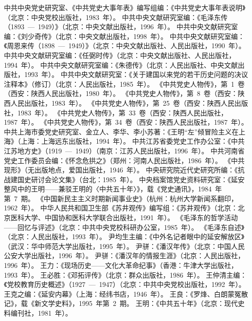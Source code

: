 \begin{thebibliography}{999}
\bibitem{}中共中央党史研究室、《中共党史大事年表》编写组编：《中共党史大事年表说明》（北京：中央党校出版社，1983~年）。
\bibitem{}中共中央文献研究室编：《毛泽东传（1893~—~1949）》（北京：中央文献出版社，1996~年）。
\bibitem{}中共中央文献研究室编：《刘少奇传》（北京：中央文献出版社，1998~年）。
\bibitem{}中共中央文献研究室编：《周恩来传（1898~—~1949）》（北京：中央文献出版社、人民出版社，1990~年）。
\bibitem{}中共中央文献研究室编：《任弼时传》（北京：中央文献出版社、人民出版社，1994~年）。
\bibitem{}中共中央文献研究室编：《朱德传》（北京：人民出版社、中央文献出版社，1993~年）。
\bibitem{}中共中央文献研究室：《关于建国以来党的若干历史问题的决议注释本》（修订）（北京：人民出版社，1985~年）。
\bibitem{}《中共党史人物传》，第~1~卷（西安：陕西人民出版社，1980~年）。
\bibitem{}《中共党史人物传》，第~8~卷（西安：陕西人民出版社，1983~年）。
\bibitem{}《中共党史人物传》，第~25~卷（西安：陕西人民出版社，1983~年）。
\bibitem{}《中共党史人物传》，第~33~卷（西安：陕西人民出版社，1987~年）。
\bibitem{}《中共党史人物传》，第~34~卷（西安：陕西人民出版社，1987~年）。
\bibitem{}中共上海市委党史研究室、金立人、李华、李小苏著：《王明“左”倾冒险主义在上海》（上海：上海远东出版社，1994~年）。
\bibitem{}中共江苏省委党史工作办公室：《中共江苏地方史》（1919~—~1949）（南京：江苏人民出版社，1996~年）。
\bibitem{}中共河南省党史工作委员会编：《怀念危拱之》（郑州：河南人民出版社，1986~年）。
\bibitem{}《中共现形》（无出版地点，爱国出版社，1946~年）。
\bibitem{}中央研究院近代史研究所编：《抗战建国史研讨会论文集》（台北：1985~年）。
\bibitem{}中央档案馆党史资料研究室：《延安整风中的王明——兼驳王明的〈中共五十年〉》，载《党史通讯》，1984~年第~7~期。
\bibitem{}《中国新民主主义时期新闻事业史》（杭州：杭州大学新闻系翻印，1962~年）。
\bibitem{}中华人民共和国卫生部《苏井观传》编写组：《苏井观传》（北京：北京医科大学、中国协和医科大学联合出版社，1991~年）。
\bibitem{}《毛泽东的哲学活动——回忆与评述》（北京：中共中央党校科研办公室，1985~年）。
\bibitem{}《毛泽东自述》（北京：人民出版社，1993~年）。
\bibitem{}尹均生主编：《中外名记者眼中的延安解放区》（武汉：华中师范大学出版社，1995~年）。
\bibitem{}尹骈：《潘汉年传》（北京：中国人民公安大学出版社，1996~年）。
\bibitem{}尹骈：《潘汉年的情报生涯》（北京：人民出版社，1996~年）。
\bibitem{}王力：《现场历史——文化大革命纪事》（香港：牛津大学出版社，1993~年）。
\bibitem{}王必胜：《邓拓评传》（北京：群众出版社，1986~年）。
\bibitem{}王仲清主编：《党校教育历史概述》（1927~—~1947）（北京：中共中央党校出版社，1992~年）。
\bibitem{}王克之编：《延安内幕》（上海：经纬书店，1946~年）。
\bibitem{}王良：《罗烽、白朗蒙冤散记》，载《新文学史料》，1995~年第~2~期。
\bibitem{}王明：《中共五十年》（北京：现代史料编刊社，1981~年）。

\end{thebibliography}
